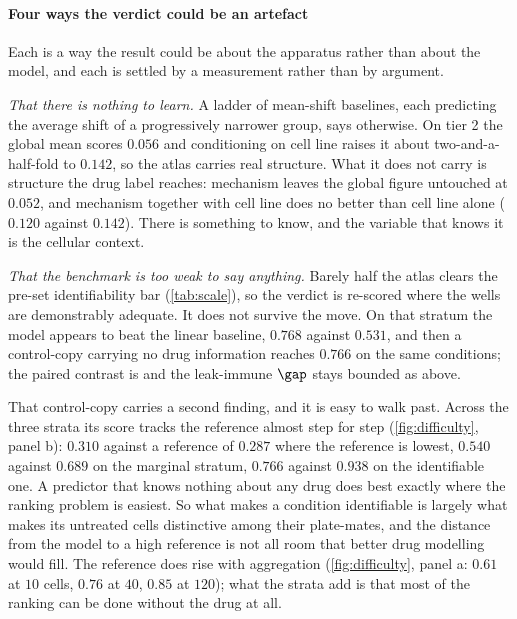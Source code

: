   \paragraph{Four ways the verdict could be an artefact} Each is a way the result
  could be about the apparatus rather than about the model, and each is settled by
  a measurement rather than by argument.
  
  \emph{That there is nothing to learn.} A ladder of mean-shift baselines, each
  predicting the average shift of a progressively narrower group, says
  otherwise. On tier 2 the global
  mean scores $0.056$ and conditioning on cell line raises it about
  two-and-a-half-fold to $0.142$, so the atlas carries real structure. What it does
  not carry is structure the drug label reaches: mechanism leaves the global figure
  untouched at $0.052$, and mechanism together with cell line does no better than
  cell line alone ($0.120$ against $0.142$). There is something to know, and the
  variable that knows it is the cellular context.
  
  \emph{That the benchmark is too weak to say anything.} Barely half the atlas
  clears the pre-set identifiability bar (\cref{tab:scale}), so the verdict is
  re-scored where the wells are demonstrably adequate. It does not survive the
  move. On that stratum the model appears to beat the linear baseline, $0.768$
  against $0.531$, and then a control-copy carrying no drug information reaches
  $0.766$ on the same conditions; the paired contrast is
   and the leak-immune $\gap$ stays bounded as above.
  
  That control-copy carries a second finding, and it is easy to walk past. Across
  the three strata its score tracks the reference almost step for step
  (\cref{fig:difficulty}, panel b): $0.310$ against a reference of $0.287$ where
  the reference is lowest, $0.540$ against $0.689$ on the marginal stratum, $0.766$
  against $0.938$ on the identifiable one. A predictor that knows nothing about any
  drug does best exactly where the ranking problem is easiest. So what makes a
  condition identifiable is largely what makes its untreated cells distinctive
  among their plate-mates, and the distance from the model to a high reference is
  not all room that better drug modelling would fill. The reference does rise with
  aggregation (\cref{fig:difficulty}, panel a: $0.61$ at $10$ cells, $0.76$ at
  $40$, $0.85$ at $120$); what the strata add is that most of the ranking can be
  done without the drug at all.
  
